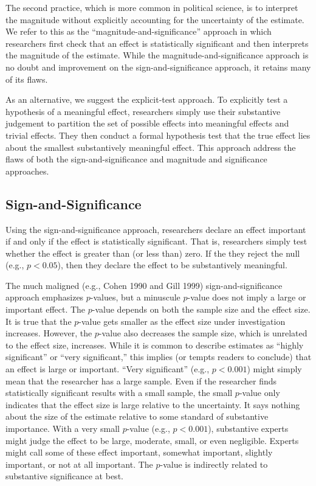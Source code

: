\documentclass[12pt]{article}
\begin{document}
The second practice, which is more common in political science, is to interpret the magnitude without explicitly accounting for the uncertainty of the estimate. We refer to this as the ``magnitude-and-significance'' approach in which researchers first check that an effect is statistically significant and then interprets the magnitude of the estimate. While the magnitude-and-significance approach is no doubt and improvement on the sign-and-significance approach, it retains many of its flaws.

As an alternative, we suggest the explicit-test approach. To explicitly test a hypothesis of a meaningful effect, researchers simply use their substantive judgement to partition the set of possible effects into meaningful effects and trivial effects. They then conduct a formal hypothesis test that the true effect lies about the smallest substantively meaningful effect. This approach address the flaws of both the sign-and-significance and magnitude and significance approaches.

\subsection*{Sign-and-Significance}

Using the sign-and-significance approach, researchers declare an effect important if and only if the effect is statistically significant. That is, researchers simply test whether the effect is greater than (or less than) zero. If the they reject the null (e.g., $p < 0.05$), then they declare the effect to be substantively meaningful.

The much maligned (e.g., Cohen 1990 and Gill 1999) sign-and-significance approach emphasizes $p$-values, but a minuscule $p$-value does not imply a large or important effect. The $p$-value depends on both the sample size and the effect size. It is true that the $p$-value gets smaller as the effect size under investigation increases. However, the $p$-value also decreases the sample size, which is unrelated to the effect size, increases. While it is common to describe estimates as ``highly significant'' or ``very significant,'' this implies (or tempts readers to conclude) that an effect is large or important. ``Very significant'' (e.g., $p < 0.001$) might simply mean that the researcher has a large sample. Even if the researcher finds statistically significant results with a small sample, the small $p$-value only indicates that the effect size is large relative to the uncertainty. It says nothing about the size of the estimate relative to some standard of substantive importance. With a very small $p$-value (e.g., $p < 0.001$), substantive experts might judge the effect to be large, moderate, small, or even negligible. Experts might call some of these effect important, somewhat important, slightly important, or not at all important. The $p$-value is indirectly related to substantive significance at best.
\end{document}
